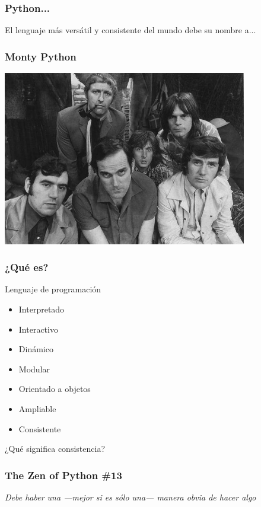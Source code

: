 \documentclass[12pt,mathserif,compress]{beamer}
\begin{document}
\begin{frame}
\frametitle{Python...}
\begin{center}
El lenguaje más versátil y consistente del mundo debe su nombre a...
\end{center}

\end{frame}

\begin{frame}
  \frametitle{Monty Python}
  \begin{center}
  \includegraphics[width=0.8\textwidth]{files/python.jpg}    
  \end{center}
\end{frame}


\begin{frame}
  \frametitle{¿Qué es?}
Lenguaje de programación
\begin{itemize}
\item Interpretado
\item Interactivo
\item Dinámico
\item Modular
\item Orientado a objetos
\item Ampliable
\item Consistente
\end{itemize}
\end{frame}

\begin{frame}
  \begin{center}
  ¿Qué significa consistencia?    
  \end{center}
\end{frame}

\begin{frame}
  \frametitle{The Zen of Python \#13}
  \begin{center}
      \textit{Debe haber una ---mejor si es sólo una--- manera obvia de
    hacer algo}
  \end{center}
\end{frame}
\end{document}
